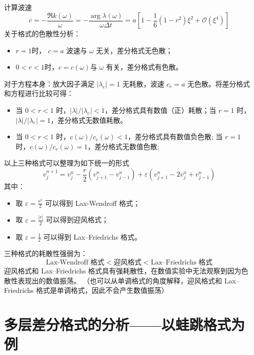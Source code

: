 \begin{solution*}
    计算波速
    \[
        c = -\frac{\Re k(\omega)}{\omega} = - \frac{\arg \lambda(\omega)}{ \omega\Delta t} = a  \left[
            1 - \frac16 (1-r^2)\xi^2 +  \mathcal{O}(\xi^4)
            \right]
    \]
    关于格式的色散性分析：
    \begin{itemize}
        \item $r=1$时， $c = a$ 波速与 $\omega$ 无关，差分格式无色散；
        \item $0<r<1$时，$c = c(\omega)$与 $\omega$ 有关，差分格式有色散。
    \end{itemize}
    对于方程本身：放大因子满足 $|\lambda_e| = 1$ 无耗散，波速 $c_e = a$ 无色散。将差分格式和方程进行比较可得：
    \begin{itemize}
        \item 当 $0 < r < 1$ 时，$|\lambda| / |\lambda_e|  < 1$，差分格式具有数值（正）耗散；当 $r=1$ 时，$|\lambda| / |\lambda_e|  = 1$，差分格式无数值耗散。
        \item 当 $0 < r < 1$ 时，$c(\omega) / c_e(\omega) < 1$，差分格式具有数值负色散; 当 $r=1$ 时，$c(\omega) / c_e(\omega) = 1$，差分格式无数值色散;
    \end{itemize}
\end{solution*}

\begin{remark}
    以上三种格式可以整理为如下统一的形式
    \[
        v_j^{n+1} = v_j^n - \frac{r}2 (v_{j+1}^n - v_{j-1}^{n}) + \varepsilon (v_{j+1}^n - 2 v_j^n + v_{j-1}^{n})
    \]
    其中：
    \begin{itemize}
        \item 取 $\varepsilon = \frac{r^2}2$ 可以得到 Lax-Wendroff 格式；
        \item 取 $\varepsilon = \frac{|r|}2$ 可以得到迎风格式；
        \item 取 $\varepsilon = \frac12$ 可以得到 Lax–Friedrichs 格式。
    \end{itemize}
    三种格式的耗散性强弱为：
    \[
        \text{Lax-Wendroff 格式} < \text{迎风格式} < \text{Lax–Friedrichs 格式}
    \]
    迎风格式和 Lax–Friedrichs 格式具有强耗散性，在数值实验中无法观察到因为色散性表现出的数值振荡。
    （也可以从单调格式的角度解释，迎风格式和 Lax–Friedrichs 格式是单调格式，因此不会产生数值振荡）
\end{remark}


\section{多层差分格式的分析——以蛙跳格式为例}\label{sec:multi-layer-format}


